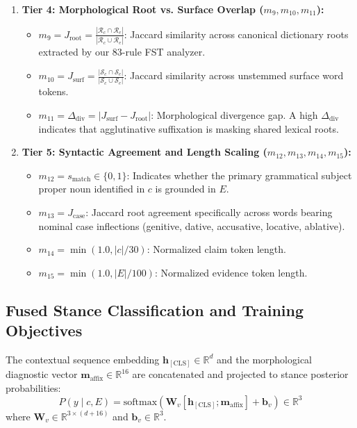 \begin{enumerate}
    \item \textbf{Tier 4: Morphological Root vs. Surface Overlap ($m_9, m_{10}, m_{11}$):}
    \begin{itemize}
        \item $m_9 = J_{\text{root}} = \frac{|\mathcal{R}_c \cap \mathcal{R}_e|}{|\mathcal{R}_c \cup \mathcal{R}_e|}$: Jaccard similarity across canonical dictionary roots extracted by our 83-rule FST analyzer.
        \item $m_{10} = J_{\text{surf}} = \frac{|\mathcal{S}_c \cap \mathcal{S}_e|}{|\mathcal{S}_c \cup \mathcal{S}_e|}$: Jaccard similarity across unstemmed surface word tokens.
        \item $m_{11} = \Delta_{\text{div}} = |J_{\text{surf}} - J_{\text{root}}|$: Morphological divergence gap. A high $\Delta_{\text{div}}$ indicates that agglutinative suffixation is masking shared lexical roots.
    \end{itemize}
    
    \item \textbf{Tier 5: Syntactic Agreement and Length Scaling ($m_{12}, m_{13}, m_{14}, m_{15}$):}
    \begin{itemize}
        \item $m_{12} = s_{\text{match}} \in \{0, 1\}$: Indicates whether the primary grammatical subject proper noun identified in $c$ is grounded in $E$.
        \item $m_{13} = J_{\text{case}}$: Jaccard root agreement specifically across words bearing nominal case inflections (genitive, dative, accusative, locative, ablative).
        \item $m_{14} = \min(1.0, |c| / 30)$: Normalized claim token length.
        \item $m_{15} = \min(1.0, |E| / 100)$: Normalized evidence token length.
    \end{itemize}
\end{enumerate}

\subsection{Fused Stance Classification and Training Objectives}
The contextual sequence embedding $\mathbf{h}_{[\text{CLS}]} \in \mathbb{R}^d$ and the morphological diagnostic vector $\mathbf{m}_{\text{affix}} \in \mathbb{R}^{16}$ are concatenated and projected to stance posterior probabilities:
\begin{equation}
    \label{eq:nli_projection}
    P(y \mid c, E) = \mathrm{softmax}\left(\mathbf{W}_v [\mathbf{h}_{[\text{CLS}]} \mathbin{;} \mathbf{m}_{\text{affix}}] + \mathbf{b}_v\right) \in \mathbb{R}^3
\end{equation}
where $\mathbf{W}_v \in \mathbb{R}^{3 \times (d + 16)}$ and $\mathbf{b}_v \in \mathbb{R}^3$.


